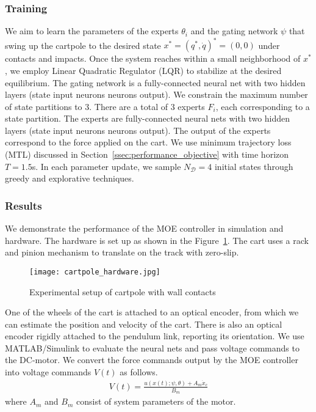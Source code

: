 \subsubsection{Training}
\label{sssec:cartpole_training}

We aim to learn the parameters of the experts $\theta_i$ and the gating network
$\psi$ that swing up the cartpole to the desired state $x^* = (q^*, \dot{q})^* =
(0, 0)$ under contacts and impacts.
%
Once the system reaches within a small neighborhood of $x^*$, we employ Linear
Quadratic Regulator (LQR) to stabilize at the desired equilibrium.
%
The gating network is a fully-connected neural net with two hidden layers (state
input  neurons  neurons  output).
% 
We constrain the maximum number of state partitions to 3.
%
There are a total of 3 experts $F_i$, each corresponding to a state
partition.
%
The experts are fully-connected neural nets with two hidden layers (state input
 neurons  neurons  output).
%
The output of the experts correspond to the force applied on the cart.
%
We use minimum trajectory loss (MTL) discussed in
Section~\ref{ssec:performance_objective} with time horizon $T=1.5$s.
%
In each parameter update, we sample $N_{\mathcal{D}}=4$ initial states through
greedy and explorative techniques.
%

\subsubsection{Results}

We demonstrate the performance of the MOE controller in simulation and hardware. 
%
The hardware is set up as shown in the Figure~\ref{fig:cartpole_hardware}.
% 
The cart uses a rack and pinion mechanism to translate on the track with
zero-slip.
%
\begin{figure}[tb]
    \centering
    \texttt{[image: cartpole\_hardware.jpg]}
    \caption{Experimental setup of cartpole with wall contacts}
    \label{fig:cartpole_hardware}
\end{figure}
One of the wheels of the cart is attached to an optical encoder, from which we
can estimate the position and velocity of the cart.
%
There is also an optical encoder rigidly attached to the pendulum link,
reporting its orientation. 
%
%
We use MATLAB/Simulink to evaluate the neural nets and pass voltage commands to
the DC-motor.
%
We convert the force commands output by the MOE controller into voltage
commands $V(t)$ as follows.
\begin{align*}
    V(t) = \frac{u(x(t); \psi, \theta) + A_m \dot{x}_c}{B_m}
\end{align*} 
\noindent where $A_m$ and $B_m$ consist of system parameters of the motor.


